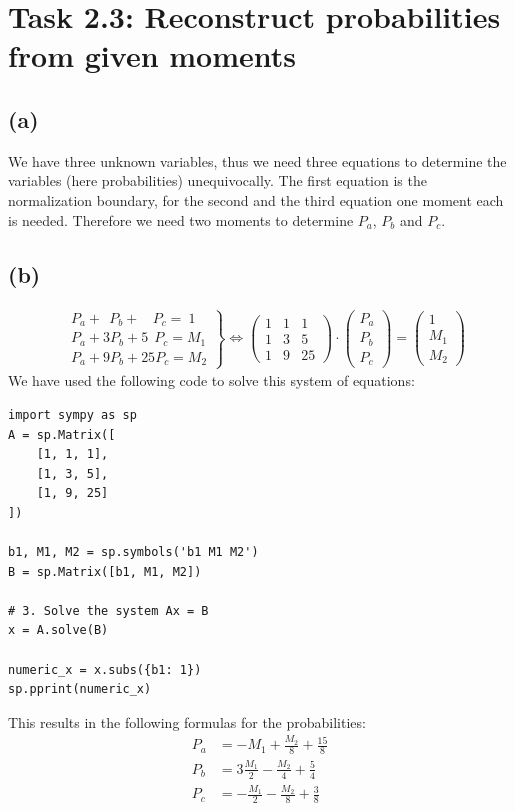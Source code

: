 \documentclass{article}
\begin{document}
\section*{Task 2.3: Reconstruct probabilities from given moments}
\subsection*{(a)}
We have three unknown variables, thus we need three equations to determine the variables (here probabilities) unequivocally. The first equation is the normalization boundary, for the second and the third equation one moment each is needed. Therefore we need two moments to determine $P_a$, $P_b$ and $P_c$.

\subsection*{(b)}
\begin{align}
\left.
\begin{aligned}
&P_a+\ \ P_b+\ \ \ \ P_c=\ 1\\
&P_a+3P_b+5\ \ P_c=M_1\\
&P_a+9P_b+25P_c=M_2
\end{aligned}
\right\}
\Leftrightarrow \begin{pmatrix}
1&1&1\\
1&3&5\\
1&9&25
\end{pmatrix}
\cdot
\begin{pmatrix}
P_a\\
P_b\\
P_c
\end{pmatrix}
=
\begin{pmatrix}
1\\
M_1\\
M_2
\end{pmatrix}
\end{align}
We have used the following code to solve this system of equations:
\begin{verbatim}
import sympy as sp
A = sp.Matrix([
    [1, 1, 1],
    [1, 3, 5],
    [1, 9, 25]
])

b1, M1, M2 = sp.symbols('b1 M1 M2')
B = sp.Matrix([b1, M1, M2])

# 3. Solve the system Ax = B
x = A.solve(B)

numeric_x = x.subs({b1: 1})
sp.pprint(numeric_x)
\end{verbatim}
This results in the following formulas for the probabilities:
\begin{align}
    P_a &= -M_1 + \frac{M_2}{8} + \frac{15}{8}\\
    P_b &= 3 \frac{M_1}{2} - \frac{M_2}{4} + \frac{5}{4}\\
    P_c &= - \frac{M_1}{2} - \frac{M_2}{8} + \frac{3}{8}
\end{align}
\end{document}
